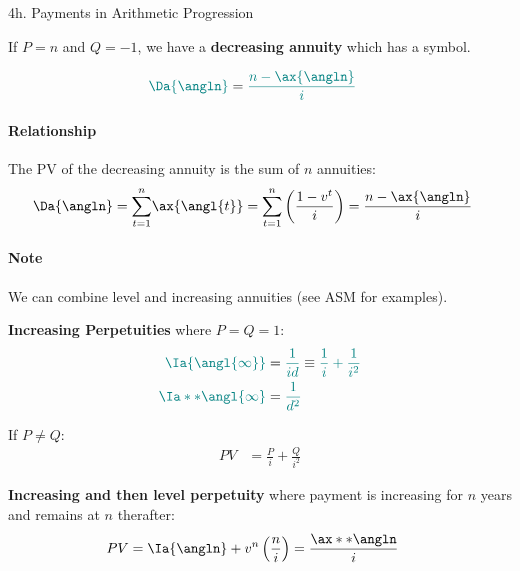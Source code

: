 \begin{CHPT_SUMM_AUTO}[label = {L.-4h}]{4h. Payments in Arithmetic Progression}
\tcbline

If $P = n$ and $Q = -1$, we have a \textbf{decreasing annuity} which has a symbol.

\begin{align*}
	\textcolor{teal}{\Da{\angln}}
	&=	\textcolor{teal}{\frac{n - \ax{\angln}}{i}}	
\end{align*}

\paragraph*{Relationship}	The PV of the decreasing annuity is the sum of $n$ annuities:
\begin{align*}
	\Da{\angln}
	&=	\underset{t = 1}{\overset{n}{\sum}} \ax{\angl{t}}	
	=	\underset{t = 1}{\overset{n}{\sum}}	\left(\frac{1 - v^{t}}{i}\right)
	=	\frac{n - \ax{\angln}}{i}
\end{align*}

\paragraph*{Note}	We can combine level and increasing annuities (see ASM for examples).

\tcbline

\textbf{Increasing Perpetuities} where $P = Q = 1$:
\begin{align*}
	\textcolor{teal}{\Ia{\angl{\infty}}}
	&=	\textcolor{teal}{\frac{1}{id}}	
	\equiv	\textcolor{teal}{\frac{1}{i} + \frac{1}{i^{2}}}	\\
	\textcolor{teal}{\Ia**{\angl{\infty}}}
	&=	\textcolor{teal}{\frac{1}{d^{2}}}	\\
\end{align*}

If $P \neq Q$:
\begin{align*}
	PV	
	&=	\frac{P}{i} + \frac{Q}{i^{2}}	
\end{align*}

\tcbline

\textbf{Increasing and then level perpetuity} where payment is increasing for $n$ years and remains at $n$ therafter:
\begin{align*}
	PV
	&=	\Ia{\angln} + v^{n} \left(\frac{n}{i}\right)
	=	\frac{\ax**{\angln}}{i}
\end{align*}

\end{CHPT_SUMM_AUTO}

